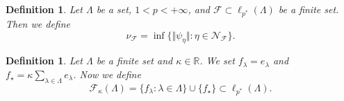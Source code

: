 \documentclass[12pt]{article}
\newtheorem{definition}[theorem]{Definition}
\begin{document}
\begin{definition}\label{ExtMorphsNormInf}
    Let $\Lambda$ be a set, $1<p<+\infty$, 
    and $\mathcal{F}\subset\ell_{p^*}(\Lambda)$ be a finite set. Then we define
    \[
        \nu_{\mathcal{F}}=\inf\{
            \Vert\psi_{\eta}\Vert : \eta\in\mathcal{N}_{\mathcal{F}}
        \}.
    \]
\end{definition}

\begin{definition}\label{SpclFuncFam}
    Let $\Lambda$ be a finite set and $\kappa\in\mathbb{R}$. We set
    $f_\lambda=e_\lambda$ 
    and $f_{\star}=\kappa\sum_{\lambda\in\Lambda} e_\lambda$. 
    Now we define
    \[
        \mathcal{F}_{\kappa}(\Lambda)
        =\{f_\lambda: \lambda\in\Lambda\}
        \cup
        \{f_\star\}
        \subset \ell_{p^*}(\Lambda).
    \]
\end{definition}
\end{document}
